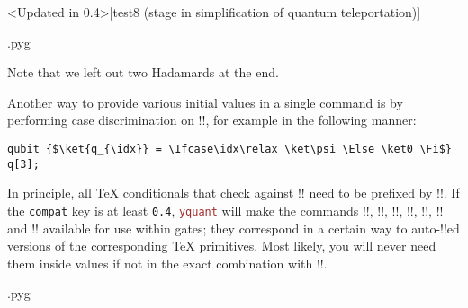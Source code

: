\documentclass{scrartcl}
\makeatletter
\newenvironment{codeexample}{%
   \VerbatimEnvironment%
   \let\FVB@VerbatimOut\minted@FVB@VerbatimOut
   \let\FVE@VerbatimOut\minted@FVE@VerbatimOut
   \minted@configlang{tex}%
   \minted@fvset
   \begin{VerbatimOut}[codes={\catcode`\^^I=12},firstline,lastline]{\minted@jobname.pyg}%
}{
   \end{VerbatimOut}%
   \minted@langlinenoson%
   \savebox\codeexamplebox{ \minted@jobname.pyg}%
   \ifdim\wd\codeexamplebox>\dimexpr.5\linewidth-3mm\relax%
      \wd\codeexamplebox=.5\linewidth%
   \else%
      \wd\codeexamplebox=\dimexpr\wd\codeexamplebox+3mm\relax%
   \fi%
   \noindent\begin{minipage}{\wd\codeexamplebox}%
      \centering%
      \usebox\codeexamplebox%
   \end{minipage}%
   \begin{minipage}{\dimexpr\linewidth-\wd\codeexamplebox\relax}%
      \minted@pygmentize{\minted@lang}%
   \end{minipage}%
   \minted@langlinenosoff%
   \par%
}
\def\pkg#1{\textcolor{brown}{\texttt{#1}}}
\def\Yquant{\pkg{yquant}}
\makeatother
\begin{document}
         \clearpage
         \begin{example}<Updated in 0.4>[test8 (stage in simplification of quantum teleportation)]
            \begin{codeexample}
            \end{codeexample}
            Note that we left out two Hadamards at the end.

            Another way to provide various initial values in a single command is by performing case discrimination on \tex!\idx!, for example in the following manner:

            \begin{verbatim}
qubit {$\ket{q_{\idx}} = \Ifcase\idx\relax \ket\psi \Else \ket0 \Fi$} q[3];
            \end{verbatim}
            In principle, all \TeX{} conditionals that check against \tex!\idx! need to be prefixed by \tex!\protect!.
            If the \texttt{compat} key is at least \texttt{0.4}, \Yquant{} will make the commands \tex!\Ifnum!, \tex!\Ifcase!, \tex!\Or!, \tex!\Else!, \tex!\Fi!, \tex!\Unless! and \tex!\The! available for use within gates; they correspond in a certain way to auto\hyp\tex!\protect!ed versions of the corresponding \TeX{} primitives.
            Most likely, you will never need them inside values if not in the exact combination with \tex!\idx!.
         \end{example}

         \clearpage
         \begin{example}
            \begin{codeexample}
            \end{codeexample}
         \end{example}
\end{document}
